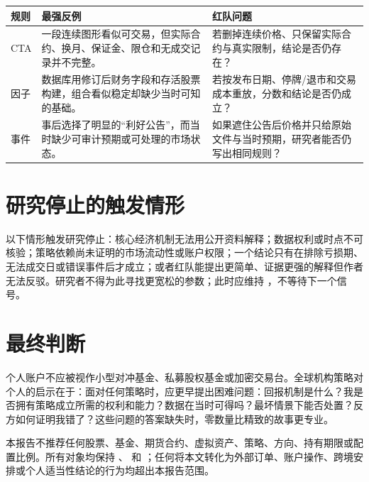 \begin{dashboardbox}
\begin{tabularx}{\textwidth}{L{2.1cm}X X}
\toprule
\textbf{规则} & \textbf{最强反例} & \textbf{红队问题} \\
\midrule
CTA & 一段连续图形看似可交易，但实际合约、换月、保证金、限仓和无成交记录并不完整。 & 若删掉连续价格、只保留实际合约与真实限制，结论是否仍存在？ \\
因子 & 数据库用修订后财务字段和存活股票构建，组合看似稳定却缺少当时可知的基础。 & 若按发布日期、停牌/退市和交易成本重放，分数和结论是否仍成立？ \\
事件 & 事后选择了明显的“利好公告”，而当时缺少可审计预期或可处理的市场状态。 & 如果遮住公告后价格并只给原始文件与当时预期，研究者能否仍写出相同规则？ \\
\bottomrule
\end{tabularx}
\end{dashboardbox}

\section{研究停止的触发情形}

以下情形触发研究停止：核心经济机制无法用公开资料解释；数据权利或时点不可核验；策略依赖尚未证明的市场流动性或账户权限；一个结论只有在排除亏损期、无法成交日或错误事件后才成立；或者红队能提出更简单、证据更强的解释但作者无法反驳。研究者不得为此寻找更宽松的参数；此时应维持 \qzero{}，不等待下一个信号。

\section{最终判断}

个人账户不应被视作小型对冲基金、私募股权基金或加密交易台。全球机构策略对个人的启示在于：面对任何策略时，应更早提出困难问题：回报机制是什么？我是否拥有策略成立所需的权利和能力？数据在当时可得吗？最坏情景下能否处置？反方如何证明我错了？这些问题的答案缺失时，零数量比精致的故事更专业。

\begin{riskbox}[最后的非执行声明]
本报告不推荐任何股票、基金、期货合约、虚拟资产、策略、方向、持有期限或配置比例。所有对象均保持 \researchonly{}、\qzero{} 和 \noaction{}；任何将本文转化为外部订单、账户操作、跨境安排或个人适当性结论的行为均超出本报告范围。
\end{riskbox}
